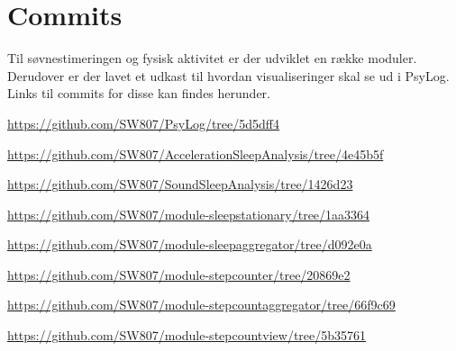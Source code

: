 \chapter{Commits}
Til søvnestimeringen og fysisk aktivitet er der udviklet en række moduler.
Derudover er der lavet et udkast til hvordan visualiseringer skal se ud i PsyLog.
Links til commits for disse kan findes herunder.

\begin{description}[style=nextline]
	\item[PsyLog - Viewbranch] \url{https://github.com/SW807/PsyLog/tree/5d5dff4}
	\item[AccelerationSleepAnalysis] \url{https://github.com/SW807/AccelerationSleepAnalysis/tree/4e45b5f}
	\item[SoundSleepAnalysis] \url{https://github.com/SW807/SoundSleepAnalysis/tree/1426d23}
	\item[module-sleepstationary] \url{https://github.com/SW807/module-sleepstationary/tree/1aa3364}
	\item[module-sleepaggregator] \url{https://github.com/SW807/module-sleepaggregator/tree/d092e0a}
	\item[module-stepcounter] \url{https://github.com/SW807/module-stepcounter/tree/20869e2}
	\item[module-stepcountaggregator] \url{https://github.com/SW807/module-stepcountaggregator/tree/66f9c69}
	\item[module-stepcountview] \url{https://github.com/SW807/module-stepcountview/tree/5b35761}
\end{description}
